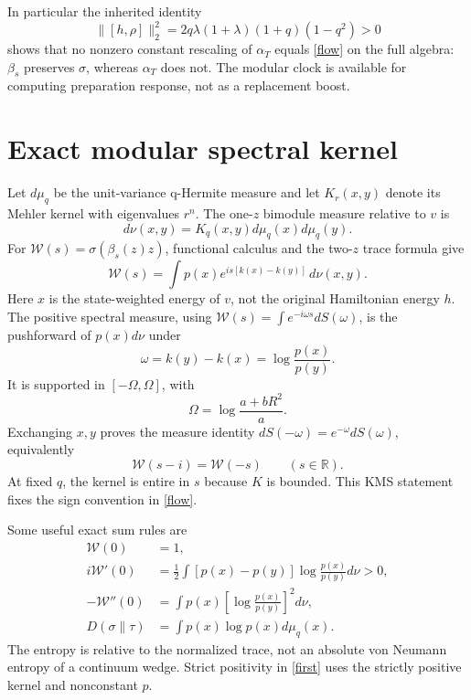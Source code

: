 \documentclass[11pt]{article}
\newcommand{\tr}{\tau}
\begin{document}
In particular the inherited identity
\[
 \|[h,\rho]\|_2^2
 =2q\lambda(1+\lambda)(1+q)(1-q^2)>0
\]
shows that no nonzero constant rescaling of $\alpha_T$ equals
\eqref{flow} on the full algebra: $\beta_s$ preserves $\sigma$,
whereas $\alpha_T$ does not. The modular clock is available for
computing preparation response, not as a replacement boost.

\newpage
\section{Exact modular spectral kernel}
Let $d\mu_q$ be the unit-variance q-Hermite measure and let
$K_r(x,y)$ denote its Mehler kernel with eigenvalues $r^n$.
The one-$z$ bimodule measure relative to $v$ is
\[
 d\nu(x,y)=K_q(x,y)d\mu_q(x)d\mu_q(y).
\]
For $\mathcal W(s)=\sigma(\beta_s(z)z)$, functional calculus
and the two-$z$ trace formula give
\begin{equation}\label{kernel}
 \boxed{\mathcal W(s)=\int p(x)e^{is[k(x)-k(y)]}\,d\nu(x,y).}
\end{equation}
Here $x$ is the state-weighted energy of $v$, not the original
Hamiltonian energy $h$. The positive spectral measure, using
$\mathcal W(s)=\int e^{-i\omega s}dS(\omega)$, is the pushforward
of $p(x)d\nu$ under
\[
 \omega=k(y)-k(x)=\log\frac{p(x)}{p(y)}.
\]
It is supported in $[-\Omega,\Omega]$, with
\begin{equation}\label{band}
 \Omega=\log\frac{a+bR^2}{a}.
\end{equation}
Exchanging $x,y$ proves the measure identity
$dS(-\omega)=e^{-\omega}dS(\omega)$, equivalently
\begin{equation}\label{kms}
 \mathcal W(s-i)=\mathcal W(-s)\qquad(s\in\mathbb R).
\end{equation}
At fixed $q$, the kernel is entire in $s$ because $K$ is bounded.
This KMS statement fixes the sign convention in \eqref{flow}.

Some useful exact sum rules are
\begin{align}
 \mathcal W(0)&=1,\\
 i\mathcal W'(0)&=\frac12\int[p(x)-p(y)]
                  \log\frac{p(x)}{p(y)}d\nu>0,\label{first}\\
 -\mathcal W''(0)&=\int p(x)\left[\log\frac{p(x)}{p(y)}\right]^2d\nu,\\
 D(\sigma\|\tr)&=\int p(x)\log p(x)d\mu_q(x).
\end{align}
The entropy is relative to the normalized trace, not an absolute
von Neumann entropy of a continuum wedge. Strict positivity in
\eqref{first} uses the strictly positive kernel and nonconstant $p$.
\end{document}

